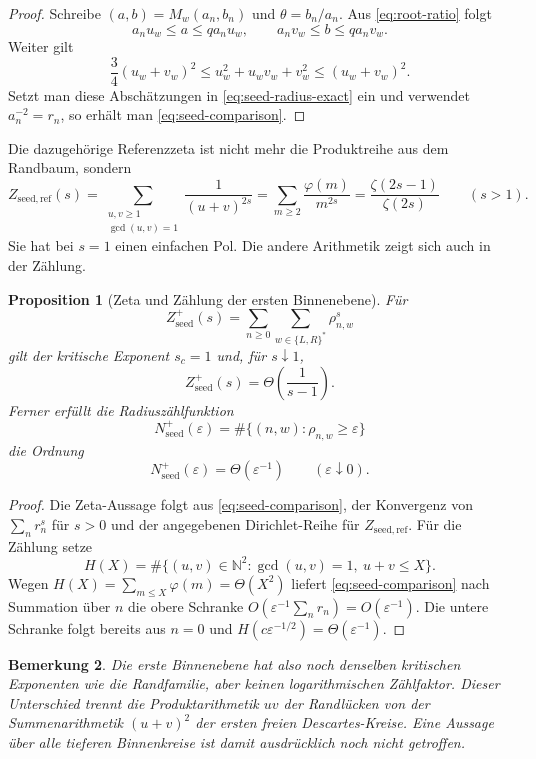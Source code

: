 \documentclass[11pt,a4paper]{article}
\newcommand{\N}{\mathbb{N}}
\newtheorem{remark}{Bemerkung}[section]
\newtheorem{proposition}[remark]{Proposition}
\begin{document}
\begin{proof}
Schreibe $(a,b)=M_w(a_n,b_n)$ und $\theta=b_n/a_n$. Aus
\eqref{eq:root-ratio} folgt
\[
 a_nu_w\le a\le q a_nu_w,
 \qquad
 a_nv_w\le b\le q a_nv_w.
\]
Weiter gilt
\[
 \frac34(u_w+v_w)^2\le u_w^2+u_wv_w+v_w^2
 \le (u_w+v_w)^2.
\]
Setzt man diese Abschätzungen in \eqref{eq:seed-radius-exact} ein und
verwendet $a_n^{-2}=r_n$, so erhält man \eqref{eq:seed-comparison}.
\end{proof}

Die dazugehörige Referenzzeta ist nicht mehr die Produktreihe aus dem
Randbaum, sondern
\[
 Z_{\mathrm{seed,ref}}(s)
 =\sum_{\substack{u,v\ge1\\\gcd(u,v)=1}}\frac{1}{(u+v)^{2s}}
 =\sum_{m\ge2}\frac{\varphi(m)}{m^{2s}}
 =\frac{\zeta(2s-1)}{\zeta(2s)}
 \qquad(s>1).
\]
Sie hat bei $s=1$ einen einfachen Pol. Die andere Arithmetik zeigt sich
auch in der Zählung.

\begin{proposition}[Zeta und Zählung der ersten Binnenebene]
Für
\[
 Z_{\mathrm{seed}}^+(s)=
 \sum_{n\ge0}\sum_{w\in\{L,R\}^*}\rho_{n,w}^s
\]
gilt der kritische Exponent $s_c=1$ und, für $s\downarrow1$,
\[
 Z_{\mathrm{seed}}^+(s)=\Theta\!\left(\frac{1}{s-1}\right).
\]
Ferner erfüllt die Radiuszählfunktion
\[
 N_{\mathrm{seed}}^+(\varepsilon)=
 \#\{(n,w):\rho_{n,w}\ge\varepsilon\}
\]
die Ordnung
\[
 N_{\mathrm{seed}}^+(\varepsilon)=\Theta(\varepsilon^{-1})
 \qquad(\varepsilon\downarrow0).
\]
\end{proposition}

\begin{proof}
Die Zeta-Aussage folgt aus \eqref{eq:seed-comparison}, der Konvergenz von
$\sum_n r_n^s$ für $s>0$ und der angegebenen Dirichlet-Reihe für
$Z_{\mathrm{seed,ref}}$. Für die Zählung setze
\[
 H(X)=\#\{(u,v)\in\N^2:\gcd(u,v)=1,\ u+v\le X\}.
\]
Wegen $H(X)=\sum_{m\le X}\varphi(m)=\Theta(X^2)$ liefert
\eqref{eq:seed-comparison} nach Summation über $n$ die obere Schranke
$O(\varepsilon^{-1}\sum_n r_n)=O(\varepsilon^{-1})$. Die untere Schranke
folgt bereits aus $n=0$ und $H(c\varepsilon^{-1/2})=\Theta(\varepsilon^{-1})$.
\end{proof}

\begin{remark}
Die erste Binnenebene hat also noch denselben kritischen Exponenten wie die
Randfamilie, aber keinen logarithmischen Zählfaktor. Dieser Unterschied
trennt die Produktarithmetik $uv$ der Randlücken von der Summenarithmetik
$(u+v)^2$ der ersten freien Descartes-Kreise. Eine Aussage über alle tieferen
Binnenkreise ist damit ausdrücklich noch nicht getroffen.
\end{remark}
\end{document}
